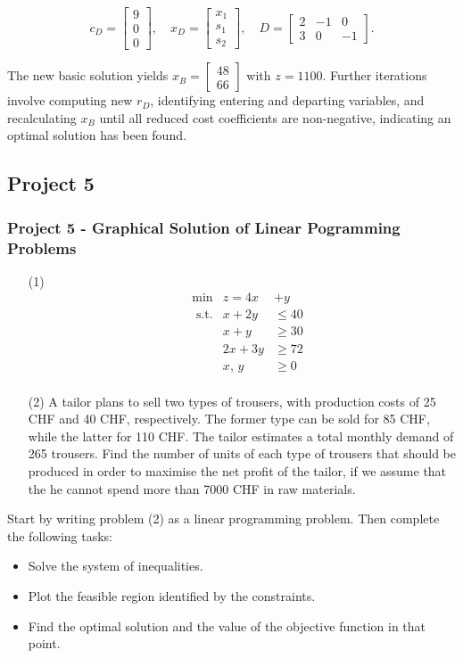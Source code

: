 \documentclass[unicode,11pt,a4paper,oneside,numbers=endperiod,openany]{scrartcl}
\begin{document}
\[
c_D = \begin{bmatrix} 9 \\ 0 \\ 0 \end{bmatrix}, \quad
x_D = \begin{bmatrix} x_1 \\ s_1 \\ s_2 \end{bmatrix}, \quad
D = \begin{bmatrix} 2 & -1 & 0 \\ 3 & 0 & -1 \end{bmatrix}.
\]

The new basic solution yields \(x_B = \begin{bmatrix} 48 \\ 66 \end{bmatrix}\) with \(z = 1100\). Further iterations involve computing new \(r_D\), identifying entering and departing variables, and recalculating \(x_B\) until all reduced cost coefficients are non-negative, indicating an optimal solution has been found.

\subsection{Project 5}
\subsubsection{Project 5 - Graphical Solution of Linear Pogramming Problems}
\begin{enumerate}
	\item[(1)] \begin{equation*}
		\begin{aligned}
		& \text{min}  &  z=4x&+y\\
		& \text{ s.t.} &  x+2y &\leq 40 \\
		& &   x+y &\geq 30\\
		& &   2x+3y &\geq 72 \\
		& &  x,\,y &\geq0 \\
		\end{aligned}
		\end{equation*}
	\item[(2)] A tailor plans to sell two types of trousers, with production costs of 25 CHF and 40 CHF, respectively. The former type can be sold for 85 CHF, while the latter for 110 CHF. The tailor estimates a total monthly demand of 265 trousers. Find the number of units of each type of trousers that should be produced in order to maximise the net profit of the tailor, if we assume that the he cannot spend more than 7000 CHF in raw materials.
\end{enumerate}
Start by writing problem (2) as a linear programming problem. Then complete the following tasks:
\begin{itemize}
	\item Solve the system of inequalities.
	\item Plot the feasible region identified by the constraints.
	\item Find the optimal solution and the value of the objective function in that point.
\end{itemize}
\end{document}
